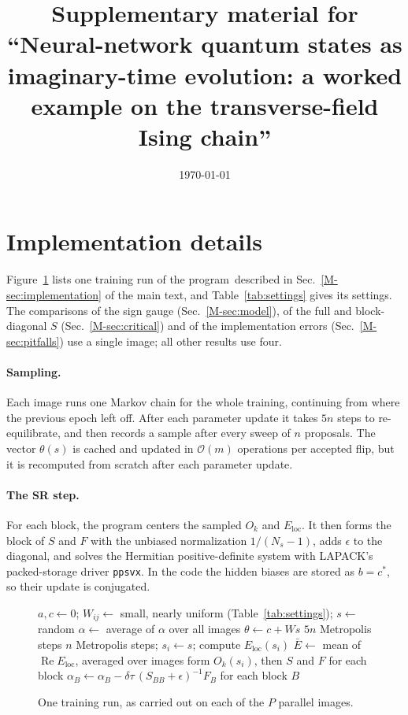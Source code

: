 \documentclass[aps,prb,preprint,amsmath,amssymb,nofootinbib,longbibliography]{revtex4-2}
\newcommand{\Eloc}{E_{\mathrm{loc}}}
\newcommand{\dtau}{\delta\tau}
\renewcommand{\Re}{\operatorname{Re}}
\begin{document}
\title{Supplementary material for ``Neural-network quantum states as imaginary-time evolution: a worked example on the transverse-field Ising chain''}
\date{\today}
\maketitle

\section{Implementation details}
\label{sec:impl}

Figure~\ref{alg:training} lists one training run of the program\codecite\ described in Sec.~\ref{M-sec:implementation} of the
main text, and Table~\ref{tab:settings} gives its settings. The comparisons of the sign gauge (Sec.~\ref{M-sec:model}),
of the full and block-diagonal $S$ (Sec.~\ref{M-sec:critical}) and of the implementation errors
(Sec.~\ref{M-sec:pitfalls}) use a single image; all other results use four.

\paragraph*{Sampling.}
Each image runs one Markov chain for the whole training, continuing from where the previous epoch left off. After
each parameter update it takes $5n$ steps to re-equilibrate, and then records a sample after every sweep of $n$
proposals. The vector $\theta(s)$ is cached and updated in $\mathcal{O}(m)$ operations per accepted flip, but it is
recomputed from scratch after each parameter update.

\paragraph*{The SR step.}
For each block, the program centers the sampled $O_k$ and $\Eloc$. It then forms the block of $S$ and $F$ with the
unbiased normalization $1/(N_s-1)$, adds $\epsilon$ to the diagonal, and solves the Hermitian positive-definite
system with LAPACK's packed-storage driver \texttt{ppsvx}. In the code the hidden biases are stored as $b = c^*$, so
their update is conjugated.

\begin{figure}[h]
\begin{algorithmic}[1]
\State $a, c \gets 0$;\; $W_{ij} \gets$ small, nearly uniform (Table~\ref{tab:settings});\; $s \gets$ random
  \State $\alpha \gets$ average of $\alpha$ over all images
  \State $\theta \gets c + W s$ 
  \State $5n$ Metropolis steps 
    \State $n$ Metropolis steps; \; $s_i \gets s$; \; compute $\Eloc(s_i)$
  \EndFor
  \State $\bar E \gets$ mean of $\Re\Eloc$, averaged over images
  \State form $O_k(s_i)$, then $S$ and $F$ for each block
  \State $\alpha_B \gets \alpha_B - \dtau\,(S_{BB} + \epsilon)^{-1} F_B$ for each block $B$
\EndFor
\end{algorithmic}
\caption{One training run, as carried out on each of the $P$ parallel images.}
\label{alg:training}
\end{figure}
\end{document}
